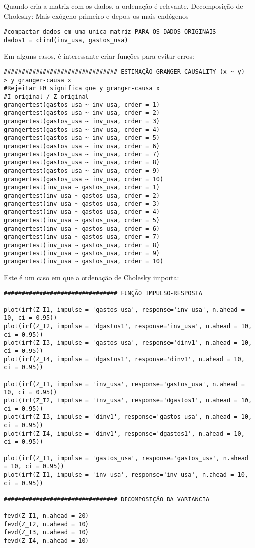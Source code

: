 \documentclass[11pt]{article}
\begin{document}
Quando cria a matriz com os dados, a ordenação é relevante. Decomposição de Cholesky: Mais exógeno primeiro e depois os mais endógenos

\begin{verbatim}
#compactar dados em uma unica matriz PARA OS DADOS ORIGINAIS
dados1 = cbind(inv_usa, gastos_usa)
\end{verbatim}


Em alguns casos, é interessante criar funções para evitar erros:

\begin{verbatim}
################################ ESTIMAÇÃO GRANGER CAUSALITY (x ~ y) -> y granger-causa x
#Rejeitar H0 significa que y granger-causa x
#I original / Z original
grangertest(gastos_usa ~ inv_usa, order = 1) 
grangertest(gastos_usa ~ inv_usa, order = 2)
grangertest(gastos_usa ~ inv_usa, order = 3)
grangertest(gastos_usa ~ inv_usa, order = 4)
grangertest(gastos_usa ~ inv_usa, order = 5)
grangertest(gastos_usa ~ inv_usa, order = 6)
grangertest(gastos_usa ~ inv_usa, order = 7)
grangertest(gastos_usa ~ inv_usa, order = 8)
grangertest(gastos_usa ~ inv_usa, order = 9)
grangertest(gastos_usa ~ inv_usa, order = 10)
grangertest(inv_usa ~ gastos_usa, order = 1) 
grangertest(inv_usa ~ gastos_usa, order = 2)
grangertest(inv_usa ~ gastos_usa, order = 3)
grangertest(inv_usa ~ gastos_usa, order = 4)
grangertest(inv_usa ~ gastos_usa, order = 5)
grangertest(inv_usa ~ gastos_usa, order = 6)
grangertest(inv_usa ~ gastos_usa, order = 7)
grangertest(inv_usa ~ gastos_usa, order = 8)
grangertest(inv_usa ~ gastos_usa, order = 9)
grangertest(inv_usa ~ gastos_usa, order = 10)
\end{verbatim}

Este é um caso em que a ordenação de Cholesky importa:

\begin{verbatim}
################################ FUNÇÃO IMPULSO-RESPOSTA

plot(irf(Z_I1, impulse = 'gastos_usa', response='inv_usa', n.ahead = 10, ci = 0.95))
plot(irf(Z_I2, impulse = 'dgastos1', response='inv_usa', n.ahead = 10, ci = 0.95))
plot(irf(Z_I3, impulse = 'gastos_usa', response='dinv1', n.ahead = 10, ci = 0.95))
plot(irf(Z_I4, impulse = 'dgastos1', response='dinv1', n.ahead = 10, ci = 0.95))

plot(irf(Z_I1, impulse = 'inv_usa', response='gastos_usa', n.ahead = 10, ci = 0.95))
plot(irf(Z_I2, impulse = 'inv_usa', response='dgastos1', n.ahead = 10, ci = 0.95))
plot(irf(Z_I3, impulse = 'dinv1', response='gastos_usa', n.ahead = 10, ci = 0.95))
plot(irf(Z_I4, impulse = 'dinv1', response='dgastos1', n.ahead = 10, ci = 0.95))

plot(irf(Z_I1, impulse = 'gastos_usa', response='gastos_usa', n.ahead = 10, ci = 0.95))
plot(irf(Z_I1, impulse = 'inv_usa', response='inv_usa', n.ahead = 10, ci = 0.95))

################################ DECOMPOSIÇÃO DA VARIANCIA

fevd(Z_I1, n.ahead = 20)
fevd(Z_I2, n.ahead = 10)
fevd(Z_I3, n.ahead = 10)
fevd(Z_I4, n.ahead = 10)
\end{verbatim}
\end{document}
